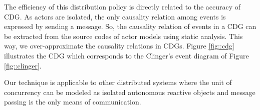 The efficiency of this distribution policy is directly related to the accuracy of CDG.
As actors are isolated, the only causality relation among events is expressed by sending a message. So, the causality relation of events in a CDG can be extracted from the source codes of actor models using static analysis. 
This way, we over-approximate the causality relations in CDGs.
%
%
Figure \ref{fig::cdg} illustrates the CDG which corresponds to the Clinger's event diagram of Figure \ref{fig::clinger}.


%

Our technique is applicable to other distributed systems where the unit of concurrency can be modeled as isolated autonomous reactive objects and message passing is the only means of communication. 
